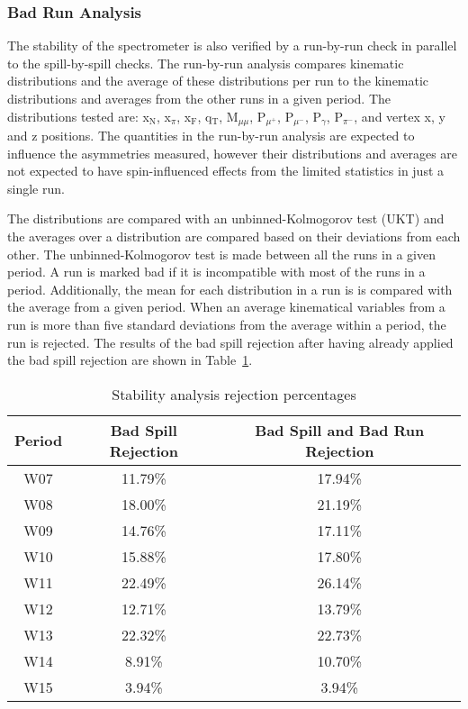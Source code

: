 \subsubsection{Bad Run Analysis}
The stability of the spectrometer is also verified by a run-by-run check in
parallel to the spill-by-spill checks.  The run-by-run analysis compares
kinematic distributions and the average of these distributions per run to the
kinematic distributions and averages from the other runs in a given period.  The
distributions tested are: x$_{\mathrm{N}}$, x$_{\pi}$, x$_{\mathrm{F}}$,
q$_{\mathrm{T}}$, M$_{\mu\mu}$, P$_{\mu^+}$, P$_{\mu^-}$, P$_{\gamma}$,
P$_{\pi^-}$, and vertex x, y and z positions.  The quantities in the run-by-run
analysis are expected to influence the asymmetries measured, however their
distributions and averages are not expected to have spin-influenced effects from
the limited statistics in just a single run.

The distributions are compared with an unbinned-Kolmogorov test (UKT) and the
averages over a distribution are compared based on their deviations from each
other.  The unbinned-Kolmogorov test is made between all the runs in a given
period.  A run is marked bad if it is incompatible with most of the runs in
a period.  Additionally, the mean for each distribution in a run is
is compared with the average from a given period.  When an average kinematical variables from a run is more than five standard deviations from the average within a
period, the run is rejected.  The results of the bad spill rejection after
having already applied the bad spill rejection are shown in
Table~\ref{tab::badspillpercent}.

\begin{table}[h!t]
  \centering
  \begin{tabular}{ |c|c|c| }
    \hline \textbf{Period}& \textbf{Bad Spill Rejection}&
    \textbf{Bad Spill and Bad Run Rejection} \\ \hline \hline
    
    W07& 11.79\%& 17.94\%\\ \hline
    W08& 18.00\%& 21.19\%\\ \hline
    W09& 14.76\%& 17.11\%\\ \hline
    W10& 15.88\%& 17.80\%\\ \hline
    W11& 22.49\%& 26.14\%\\ \hline
    W12& 12.71\%& 13.79\%\\ \hline
    W13& 22.32\%& 22.73\%\\ \hline
    W14& 8.91\%& 10.70\%\\ \hline
    W15& 3.94\%& 3.94\%\\ \hline

  \end{tabular}
  \caption{Stability analysis rejection percentages}
  \label{tab::badspillpercent}
\end{table}


